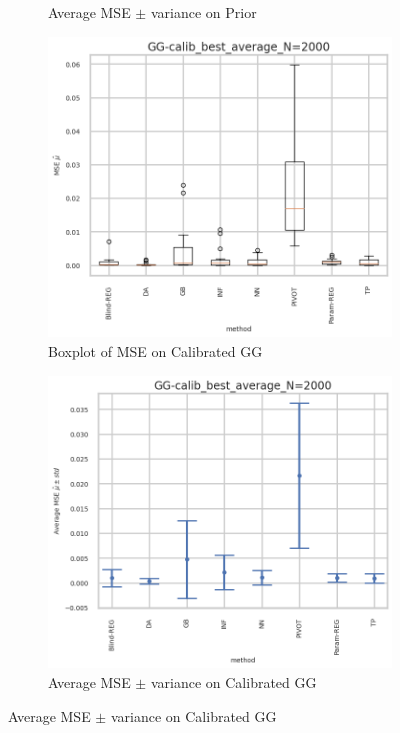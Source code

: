 \begin{figure}[ht!]
\begin{subfigure}[t]{0.49\linewidth}
    \caption{Average MSE $\pm$ variance on Prior}
  \end{subfigure}

  \begin{subfigure}[t]{0.49\linewidth}
    \includegraphics[width=\linewidth]{COMPARE/GG-calib/BEST_MSE/GG-calib_best_average_N=2000-boxplot_mse.png}
    \caption{Boxplot of MSE on Calibrated GG}
  \end{subfigure}%
  \hfill
  \begin{subfigure}[t]{0.49\linewidth}
    \includegraphics[width=\linewidth]{COMPARE/GG-calib/BEST_MSE/GG-calib_best_average_N=2000-errplot_mse.png}
    \caption{Average MSE $\pm$ variance on Calibrated GG}
  \end{subfigure}


\end{figure}
